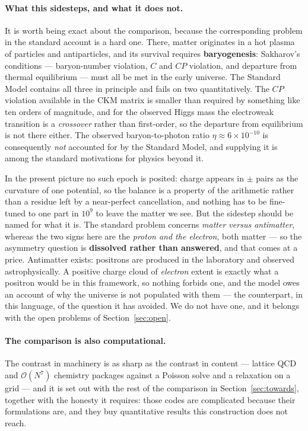 \documentclass[11pt]{article}
\begin{document}
\paragraph{What this sidesteps, and what it does not.} It is worth being exact about the comparison, because the
corresponding problem in the standard account is a hard one. There, matter originates in a hot plasma of particles
and antiparticles, and its survival requires \textbf{baryogenesis}: Sakharov's conditions --- baryon-number
violation, $C$ and $CP$ violation, and departure from thermal equilibrium --- must all be met in the early
universe. The Standard Model contains all three in principle and fails on two quantitatively. The $CP$ violation
available in the CKM matrix is smaller than required by something like ten orders of magnitude, and for the
observed Higgs mass the electroweak transition is a \emph{crossover} rather than first-order, so the departure
from equilibrium is not there either. The observed baryon-to-photon ratio $\eta\approx6\times10^{-10}$ is
consequently \emph{not} accounted for by the Standard Model, and supplying it is among the standard motivations
for physics beyond it.

In the present picture no such epoch is posited: charge appears in $\pm$ pairs as the curvature of one potential,
so the balance is a property of the arithmetic rather than a residue left by a near-perfect cancellation, and
nothing has to be fine-tuned to one part in $10^{9}$ to leave the matter we see. But the sidestep should be named
for what it is. The standard problem concerns \emph{matter versus antimatter}, whereas the two signs here are the
\emph{proton and the electron}, both matter --- so the asymmetry question is \textbf{dissolved rather than
answered}, and that comes at a price. Antimatter exists: positrons are produced in the laboratory and observed
astrophysically. A positive charge cloud of \emph{electron} extent is exactly what a positron would be in this
framework, so nothing forbids one, and the model owes an account of why the universe is not populated with them
--- the counterpart, in this language, of the question it has avoided. We do not have one, and it belongs with the
open problems of Section~\ref{sec:open}.

\paragraph{The comparison is also computational.} The contrast in machinery is as sharp as the contrast in
content --- lattice QCD and $\mathcal{O}(N^7)$ chemistry packages against a Poisson solve and a relaxation on a
grid --- and it is set out with the rest of the comparison in Section~\ref{sec:towards}, together with the
honesty it requires: those codes are complicated because their formulations are, and they buy quantitative
results this construction does not reach.
\end{document}
